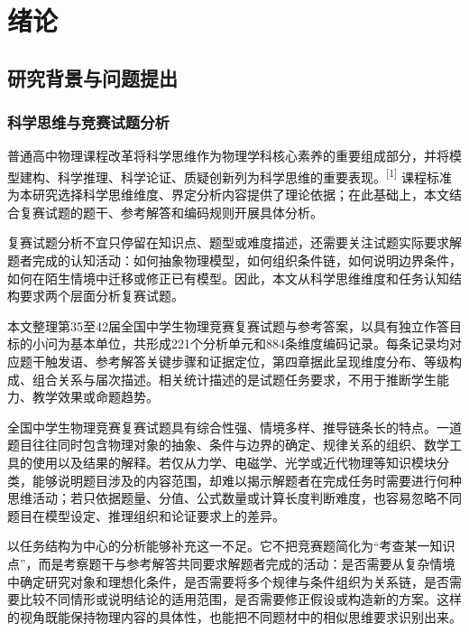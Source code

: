 \documentclass[
  12pt,
  a4paper,twoside,openany]{ctexbook}
\begin{document}
\chapter{绪论}\label{ux7eeaux8bba}

\section{研究背景与问题提出}\label{ux7814ux7a76ux80ccux666fux4e0eux95eeux9898ux63d0ux51fa}

\subsection{科学思维与竞赛试题分析}\label{ux79d1ux5b66ux601dux7ef4ux4e0eux7adeux8d5bux8bd5ux9898ux5206ux6790}

普通高中物理课程改革将科学思维作为物理学科核心素养的重要组成部分，并将模型建构、科学推理、科学论证、质疑创新列为科学思维的重要表现。\textsuperscript{[1]}
课程标准为本研究选择科学思维维度、界定分析内容提供了理论依据；在此基础上，本文结合复赛试题的题干、参考解答和编码规则开展具体分析。

复赛试题分析不宜只停留在知识点、题型或难度描述，还需要关注试题实际要求解题者完成的认知活动：如何抽象物理模型，如何组织条件链，如何说明边界条件，如何在陌生情境中迁移或修正已有模型。因此，本文从科学思维维度和任务认知结构要求两个层面分析复赛试题。

本文整理第35至42届全国中学生物理竞赛复赛试题与参考答案，以具有独立作答目标的小问为基本单位，共形成221个分析单元和884条维度编码记录。每条记录均对应题干触发语、参考解答关键步骤和证据定位，第四章据此呈现维度分布、等级构成、组合关系与届次描述。相关统计描述的是试题任务要求，不用于推断学生能力、教学效果或命题趋势。

全国中学生物理竞赛复赛试题具有综合性强、情境多样、推导链条长的特点。一道题目往往同时包含物理对象的抽象、条件与边界的确定、规律关系的组织、数学工具的使用以及结果的解释。若仅从力学、电磁学、光学或近代物理等知识模块分类，能够说明题目涉及的内容范围，却难以揭示解题者在完成任务时需要进行何种思维活动；若只依据题量、分值、公式数量或计算长度判断难度，也容易忽略不同题目在模型设定、推理组织和论证要求上的差异。

以任务结构为中心的分析能够补充这一不足。它不把竞赛题简化为``考查某一知识点''，而是考察题干与参考解答共同要求解题者完成的活动：是否需要从复杂情境中确定研究对象和理想化条件，是否需要将多个规律与条件组织为关系链，是否需要比较不同情形或说明结论的适用范围，是否需要修正假设或构造新的方案。这样的视角既能保持物理内容的具体性，也能把不同题材中的相似思维要求识别出来。
\end{document}

